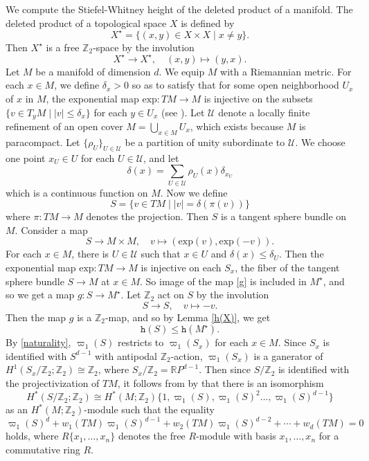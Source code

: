 \documentclass[amsfonts]{amsart}
\numberwithin{equation}{section}
\theoremstyle{definition}
\theoremstyle{remark}
\newcommand{\Z}{\mathbb{Z}}
\newcommand{\R}{\mathbb{R}}
\newcommand{\h}{\mathtt{h}}
\begin{document}
  We compute the Stiefel-Whitney height of the deleted product of a manifold. The deleted product of a topological space $X$ is defined by
  \[
    X^\star=\{(x,y)\in X\times X\mid x\ne y\}.
  \]
  Then $X^\star$ is a free $\Z_2$-space by the involution
  \[
    X^\star\to X^\star,\quad(x,y)\mapsto(y,x).
  \]
  Let $M$ be a manifold of dimension $d$. We equip $M$ with a Riemannian metric. For each $x\in M$, we define $\delta_x>0$ so as to satisfy that for some open neighborhood $U_x$ of $x$ in $M$, the exponential map $\mathrm{exp}\colon TM\to M$ is injective on the subsets $\{v\in T_yM\mid|v|\le\delta_x\}$ for each $y\in U_x$ (see \cite[Lemma 10.3]{M}). Let $\mathcal{U}$ denote a locally finite refinement of an open cover $M=\bigcup_{x\in M}U_x$, which exists because $M$ is paracompact. Let $\{\rho_U\}_{U\in\mathcal{U}}$ be a partition of unity subordinate to $\mathcal{U}$. We choose one point $x_U\in U$ for each $U\in\mathcal{U}$, and let
  \[
    \delta(x)=\sum_{U\in\mathcal{U}}\rho_U(x)\delta_{x_U}
  \]
  which is a continuous function on $M$. Now we define
  \[
    S=\{v\in TM\mid |v|=\delta(\pi(v))\}
  \]
  where $\pi\colon TM\to M$ denotes the projection. Then $S$ is a tangent sphere bundle on $M$. Consider a map
  \begin{equation}
    \label{g}
    S\to M\times M,\quad v\mapsto(\mathrm{exp}(v),\mathrm{exp}(-v)).
  \end{equation}
  For each $x\in M$, there is $U\in\mathcal{U}$ such that $x\in U$ and $\delta(x)\le\delta_U$. Then the exponential map $\mathrm{exp}\colon TM\to M$ is injective on each $S_x$, the fiber of the tangent sphere bundle $S\to M$ at $x\in M$. So image of the map \eqref{g} is included in $M^\star$, and so we get a map $g\colon S\to M^\star$. Let $\Z_2$ act on $S$ by the involution
  \[
    S\to S,\quad v\mapsto-v.
  \]
  Then the map $g$ is a $\Z_2$-map, and so by Lemma \ref{h(X)}, we get
  \begin{equation}
    \label{h(S)}
    \h(S)\le\h(M^\star).
  \end{equation}
  By \eqref{naturality}, $\varpi_1(S)$ restricts to $\varpi_1(S_x)$ for each $x\in M$. Since $S_x$ is identified with $S^{d-1}$ with antipodal $\Z_2$-action, $\varpi_1(S_x)$ is a ganerator of $H^1(S_x/\Z_2;\Z_2)\cong\Z_2$, where $S_x/\Z_2=\R P^{d-1}$. Then since $S/\Z_2$ is identified with the projectivization of $TM$, it follows from by \cite[(19.2.2) Theorem and Section 19.4]{tD} that there is an isomorphism
  \[
    H^*(S/\Z_2;\Z_2)\cong H^*(M;\Z_2)\{1,\varpi_1(S),\varpi_1(S)^2\ldots,\varpi_1(S)^{d-1}\}
  \]
  as an $H^*(M;\Z_2)$-module such that the equality
  \begin{equation}
    \label{w(S)}
    \varpi_1(S)^d+w_1(TM)\varpi_1(S)^{d-1}+w_2(TM)\varpi_1(S)^{d-2}+\cdots+w_d(TM)=0
  \end{equation}
  holds, where $R\{x_1,\ldots,x_n\}$ denotes the free $R$-module with basis $x_1,\ldots,x_n$ for a commutative ring $R$.
\end{document}
